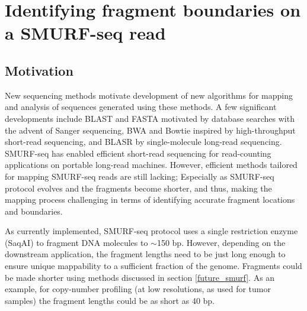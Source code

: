 \chapter{Identifying fragment boundaries on a SMURF-seq read}
\label{ch4}

\section{Motivation}
New sequencing methods motivate development of new algorithms for
mapping and analysis of sequences generated using these methods. A few
significant developments include BLAST \citep{altschul1990basic} and
FASTA \citep{pearson1988improved} motivated by database searches with the
advent of Sanger sequencing, BWA \citep{li2009fast} and Bowtie
\citep{langmead2009ultrafast} inspired by high-throughput short-read
sequencing, and BLASR \citep{chaisson2012mapping} by single-molecule
long-read sequencing.
SMURF-seq has enabled efficient short-read sequencing for read-counting
applications on portable long-read machines.  However, efficient methods
tailored for mapping SMURF-seq reads are still lacking; Especially as
SMURF-seq protocol evolves and the fragments become shorter, and thus,
making the mapping process challenging in terms of identifying accurate
fragment locations and boundaries.

As currently implemented, SMURF-seq protocol uses a single restriction
enzyme (SaqAI) to fragment DNA molecules to $\sim$150 bp. However,
depending on the downstream application, the fragment lengths need to be
just long enough to ensure unique mappability to a sufficient fraction
of the genome.
Fragments could be made shorter using methods discussed in section
\ref{future_smurf}.  As an example, for copy-number profiling (at low
resolutions, as used for tumor samples) the fragment lengths could be as
short as 40 bp.

